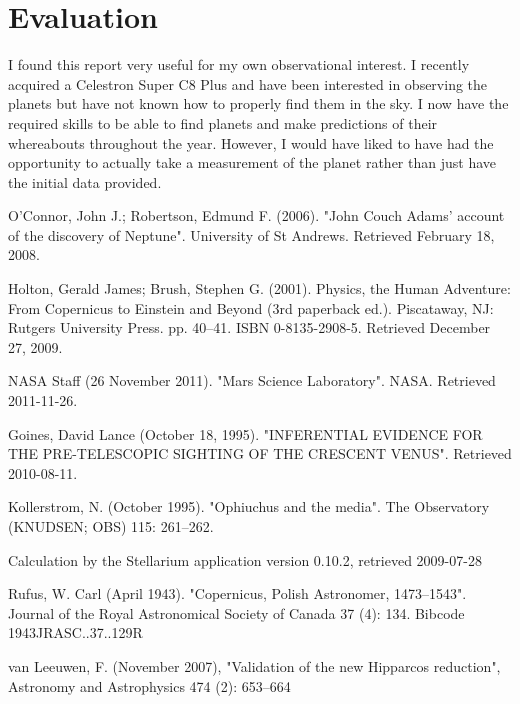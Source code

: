 \documentclass{article}
\begin{document}

\section{Evaluation}

I found this report very useful for my own observational interest. I recently acquired a Celestron Super C8 Plus and have
been interested in observing the planets but have not known how to properly find them in the sky. I now have the 
required skills to be able to find planets and make predictions of their whereabouts throughout the year. However, I would
have liked to have had the opportunity to actually take a measurement of the planet rather than just have the initial
data provided.


\begin{thebibliography}{9}

O'Connor, John J.; Robertson, Edmund F. (2006). "John Couch Adams' account of the discovery of Neptune". University of St Andrews. Retrieved February 18, 2008.

Holton, Gerald James; Brush, Stephen G. (2001). Physics, the Human Adventure: From Copernicus to Einstein and Beyond (3rd paperback ed.). Piscataway, NJ: Rutgers University Press. pp. 40–41. ISBN 0-8135-2908-5. Retrieved December 27, 2009.

NASA Staff (26 November 2011). "Mars Science Laboratory". NASA. Retrieved 2011-11-26.

 Goines, David Lance (October 18, 1995). "INFERENTIAL EVIDENCE FOR THE PRE-TELESCOPIC SIGHTING OF THE CRESCENT VENUS". Retrieved 2010-08-11.

Kollerstrom, N. (October 1995). "Ophiuchus and the media". The Observatory (KNUDSEN; OBS) 115: 261–262.

Calculation by the Stellarium application version 0.10.2, retrieved 2009-07-28

Rufus, W. Carl (April 1943). "Copernicus, Polish Astronomer, 1473–1543". Journal of the Royal Astronomical Society of Canada 37 (4): 134. Bibcode 1943JRASC..37..129R

van Leeuwen, F. (November 2007), "Validation of the new Hipparcos reduction", Astronomy and Astrophysics 474 (2): 653–664

\end{thebibliography}
\end{document}
